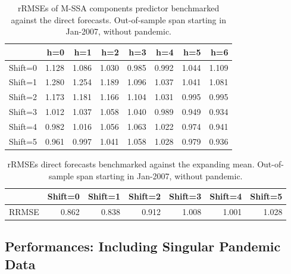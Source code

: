 \documentclass[a4paper]{article}
\begin{document}
\begin{table}[ht]
\centering
\begin{tabular}{rrrrrrrr}
  \hline
 & h=0 & h=1 & h=2 & h=3 & h=4 & h=5 & h=6 \\ 
  \hline
Shift=0 & 1.128 & 1.086 & 1.030 & 0.985 & 0.992 & 1.044 & 1.109 \\ 
  Shift=1 & 1.280 & 1.254 & 1.189 & 1.096 & 1.037 & 1.041 & 1.081 \\ 
  Shift=2 & 1.173 & 1.181 & 1.166 & 1.104 & 1.031 & 0.995 & 0.995 \\ 
  Shift=3 & 1.012 & 1.037 & 1.058 & 1.040 & 0.989 & 0.949 & 0.934 \\ 
  Shift=4 & 0.982 & 1.016 & 1.056 & 1.063 & 1.022 & 0.974 & 0.941 \\ 
  Shift=5 & 0.961 & 0.997 & 1.041 & 1.058 & 1.028 & 0.979 & 0.936 \\ 
   \hline
\end{tabular}
\caption{rRMSEs of M-SSA components predictor benchmarked against the direct forecasts. Out-of-sample span starting in Jan-2007, without pandemic.} 
\label{rRMSE_mSSA_comp_direct_without_covid7}
\end{table}%
\begin{table}[ht]
\centering
\begin{tabular}{rrrrrrr}
  \hline
 & Shift=0 & Shift=1 & Shift=2 & Shift=3 & Shift=4 & Shift=5 \\ 
  \hline
RRMSE & 0.862 & 0.838 & 0.912 & 1.008 & 1.001 & 1.028 \\ 
   \hline
\end{tabular}
\caption{rRMSEs direct forecasts benchmarked against the expanding mean. Out-of-sample span starting in Jan-2007, without pandemic.} 
\label{rRMSE_mSSA_direct_mean_without_covid8}
\end{table}

\newpage
\subsection{Performances: Including Singular Pandemic Data}
\end{document}
